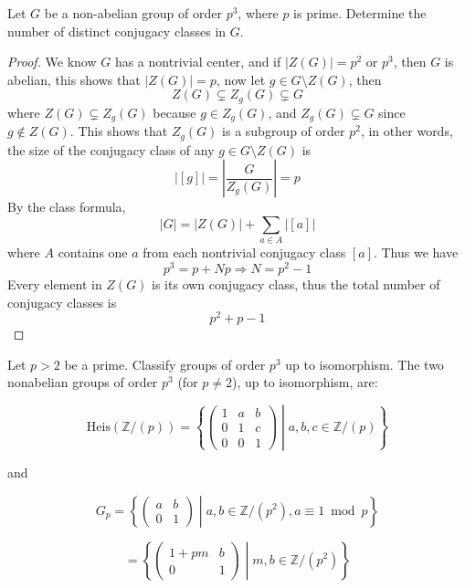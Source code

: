 \begin{prob}[S2010-Q1]
    Let \( G \) be a non-abelian group of order \( p^3 \), where \( p \) is prime. Determine the number of distinct conjugacy classes in \( G \).
\end{prob}
\begin{proof}
    We know $G$ has a nontrivial center, and if $|Z(G)|=p^2$ or $p^3$, then $G$ is abelian, this shows that $|Z(G)|=p$, now let $g\in G\setminus Z(G)$, then 
    \begin{equation*}
        Z(G)\subsetneq Z_g(G)\subsetneq G
    \end{equation*}
    where $Z(G)\subsetneq Z_g(G)$ because $g\in Z_g(G)$, and $Z_g(G)\subsetneq G$ since $g\not\in Z(G)$. This shows that $Z_g(G)$ is a subgroup of order $p^2$, in other words, the size of the conjugacy class of any $g\in G\setminus Z(G)$ is 
    \begin{equation*}
        |[g]|=\left|\frac{G}{Z_g(G)}\right|=p
    \end{equation*}
    By the class formula, 
    \begin{equation*}
        |G|=|Z(G)|+\sum_{a\in A}|[a]|
    \end{equation*}
    where $A$ contains one $a$ from each nontrivial conjugacy class $[a]$. Thus we have 
    \begin{equation*}
        p^3=p+Np\Rightarrow N=p^2-1
    \end{equation*}
    Every element in $Z(G)$ is its own conjugacy class, thus the total number of conjugacy classes is 
    \begin{equation*}
        p^2+p-1
    \end{equation*}
\end{proof}

\begin{prob}[F2013-Q1]
    Let $p>2$ be a prime. Classify groups of order $p^3$ up to isomorphism. The two nonabelian groups of order \( p^3 \) (for \( p \neq 2 \)), up to isomorphism, are:

    \[
    \text{Heis}(\mathbb{Z}/(p)) = 
    \left\{ 
    \left( \begin{array}{ccc}
    1 & a & b \\
    0 & 1 & c \\
    0 & 0 & 1
    \end{array} \right) \middle| a, b, c \in \mathbb{Z}/(p)
    \right\}
    \]
    
    and
    
    \[
    G_p = 
    \left\{ 
    \left( \begin{array}{cc}
    a & b \\
    0 & 1
    \end{array} \right) \middle| a, b \in \mathbb{Z}/(p^2), a \equiv 1 \bmod p
    \right\}
    \]
    
    \[
    = 
    \left\{ 
    \left( \begin{array}{cc}
    1 + pm & b \\
    0 & 1
    \end{array} \right) \middle| m, b \in \mathbb{Z}/(p^2)
    \right\}
    \]
\end{prob}

